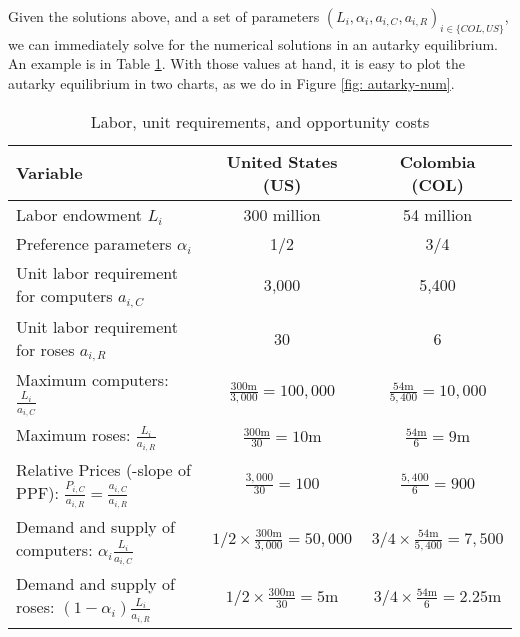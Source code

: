 \documentclass[11pt,letterpaper]{article}
\begin{document}
Given the solutions above, and a set of parameters $(L_i, \alpha_i, a_{i,C}, a_{i,R})_{i \in \{COL, US\}}$, we can immediately solve for the numerical solutions in an autarky equilibrium. An example is in Table \ref{tab: autarky-num}. With those values at hand, it is easy to plot the autarky equilibrium in two charts, as we do in Figure \ref{fig: autarky-num}.

\begin{table}[htbp]
\centering
\begin{tabular}{lcc}
\toprule
\textbf{Variable} & \textbf{United States (US)} & \textbf{Colombia (COL)} \\
\midrule
Labor endowment $L_i$ & 300 million & 54 million \\
Preference parameters $\alpha_i$ & 1/2 & 3/4 \\
Unit labor requirement for computers $a_{i,C}$ & 3{,}000 & 5{,}400 \\
Unit labor requirement for roses $a_{i,R}$ & 30 & 6 \\
\midrule
Maximum computers: $\frac{L_{i}}{a_{i,C}}$ & $\frac{300 \text{m}}{3{,}000} = 100{,}000$ & $\frac{54 \text{m}}{5{,}400} = 10{,}000$ \\
Maximum roses: $\frac{L_{i}}{a_{i,R}}$ & $\frac{300 \text{m}}{30} = 10 \text{m}$ & $\frac{54 \text{m}}{6} = 9 \text{m}$ \\
\midrule
Relative Prices (-slope of PPF): $\frac{P_{i,C}}{a_{i,R}} = \frac{a_{i,C}}{a_{i,R}}$ & $\frac{3{,}000}{30} = 100$ & $\frac{5{,}400}{6} = 900$ \\
Demand and supply of computers: $\alpha_i  \frac{L_i}{a_{i,C}}$ & $1/2 \times \frac{300 \text{m}}{3{,}000} = 50{,}000$ & $3/4 \times \frac{54 \text{m}}{5{,}400} = 7{,}500$ \\
Demand and supply of roses: $(1-\alpha_i)  \frac{L_i}{a_{i,R}}$ & $1/2 \times \frac{300 \text{m}}{30} = 5 \text{m}$ & $3/4 \times \frac{54 \text{m}}{6} = 2{.}25 \text{m}$ \\
\bottomrule
\end{tabular}
\caption{Labor, unit requirements, and opportunity costs}\label{tab: autarky-num}
\end{table}
\end{document}
